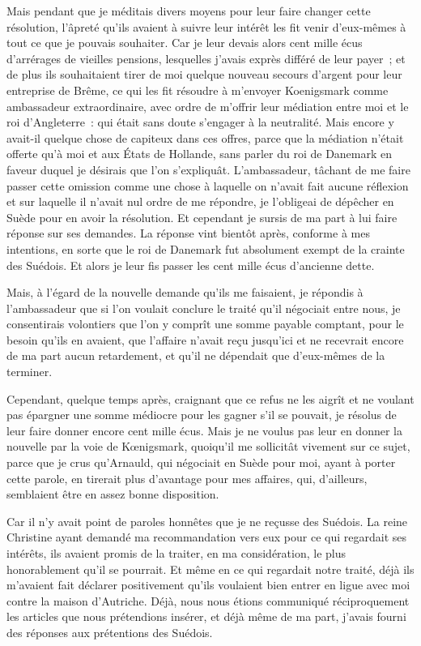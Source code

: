 \documentclass[french,twoside]{book} %
\begin{document}
Mais pendant que je méditais divers moyens pour leur faire changer cette résolution, l’âpreté qu’ils avaient à suivre leur intérêt les fit venir d’eux-mêmes à tout ce que je pouvais souhaiter. Car je leur devais alors cent mille écus d’arrérages de vieilles pensions, lesquelles j’avais exprès différé de leur payer ; et de plus ils souhaitaient tirer de moi quelque nouveau secours d’argent pour leur entreprise de Brême, ce qui les fit résoudre à m’envoyer Koenigsmark comme ambassadeur extraordinaire, avec ordre de m’offrir leur médiation entre moi et le roi d’Angleterre : qui était sans doute s’engager à la neutralité. Mais encore y avait-il quelque chose de capiteux dans ces offres, parce que la médiation n’était offerte qu’à moi et aux États de Hollande, sans parler du roi de Danemark en faveur duquel je désirais que l’on s’expliquât. L’ambassadeur, tâchant de me faire passer cette omission comme une chose à laquelle on n’avait fait aucune réflexion et sur laquelle il n’avait nul ordre de me répondre, je l’obligeai de dépêcher en Suède pour en avoir la résolution. Et cependant je sursis de ma part à lui faire réponse sur ses demandes. La réponse vint bientôt après, conforme à mes intentions, en sorte que le roi de Danemark fut absolument exempt de la crainte des Suédois. Et alors je leur fis passer les cent mille écus d’ancienne dette.\par
Mais, à l’égard de la nouvelle demande qu’ils me faisaient, je répondis à l’ambassadeur que si l’on voulait conclure le traité qu’il négociait entre nous, je consentirais volontiers que l’on y comprît une somme payable comptant, pour le besoin qu’ils en avaient, que l’affaire n’avait reçu jusqu’ici et ne recevrait encore de ma part aucun retardement, et qu’il ne dépendait que d’eux-mêmes de la terminer.\par
Cependant, quelque temps après, craignant que ce refus ne les aigrît et ne voulant pas épargner une somme médiocre pour les gagner s’il se pouvait, je résolus de leur faire donner encore cent mille écus. Mais je ne voulus pas leur en donner la nouvelle par la voie de Kœnigsmark, quoiqu’il me sollicitât vivement sur ce sujet, parce que je crus qu’Arnauld, qui négociait en Suède pour moi, ayant à porter cette parole, en tirerait plus d’avantage pour mes affaires, qui, d’ailleurs, semblaient être en assez bonne disposition.\par
Car il n’y avait point de paroles honnêtes que je ne reçusse des Suédois. La reine Christine ayant demandé ma recommandation vers eux pour ce qui regardait ses intérêts, ils avaient promis de la traiter, en ma considération, le plus honorablement qu’il se pourrait. Et même en ce qui regardait notre traité, déjà ils m’avaient fait déclarer positivement qu’ils voulaient bien entrer en ligue avec moi contre la maison d’Autriche. Déjà, nous nous étions communiqué réciproquement les articles que nous prétendions insérer, et déjà même de ma part, j’avais fourni des réponses aux prétentions des Suédois.\par
\end{document}
